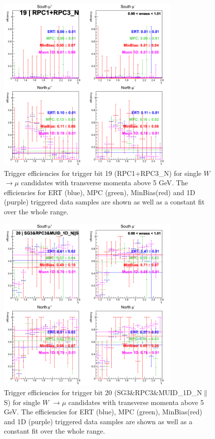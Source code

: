 \begin{figure}[ht]
\begin{center}
\includegraphics[width=0.8\textwidth]{./figures/run13_trigeffieta_w1_trig19_lin.png}
\caption{\label{fig:run13_trigeffieta_w0_nper0_trig19_lin} Trigger efficiencies for trigger bit 19 (RPC1+RPC3\_N) for single $W$ $\rightarrow \mu$ candidates with transverse momenta above 5 GeV. The efficiencies for ERT (blue), MPC (green), MinBias(red) and 1D (purple) triggered data samples are shown as well as a constant fit over the whole range.}
\end{center}
\end{figure}
\begin{figure}[ht]
\begin{center}
\includegraphics[width=0.8\textwidth]{./figures/run13_trigeffieta_w1_trig20_lin.png}
\caption{\label{fig:run13_trigeffieta_w0_nper0_trig20_lin} Trigger efficiencies for trigger bit 20 (SG3\&RPC3\&MUID\_1D\_N$\|$S) for single $W$ $\rightarrow \mu$ candidates with transverse momenta above 5 GeV. The efficiencies for ERT (blue), MPC (green), MinBias(red) and 1D (purple) triggered data samples are shown as well as a constant fit over the whole range.}
\end{center}
\end{figure}
